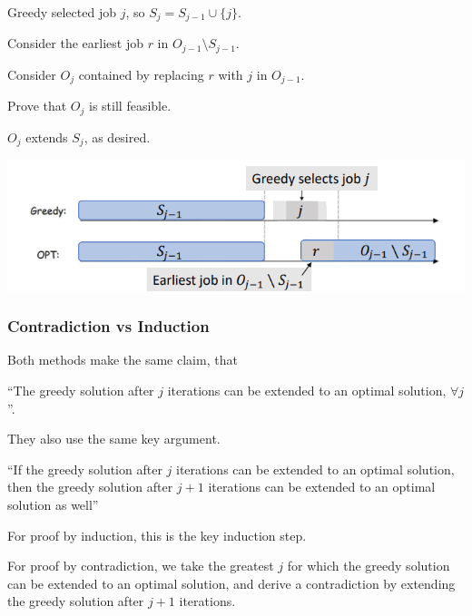 \begin{listu}
\begin{listo}
        \item Greedy selected job $j$, so $S_j = S_{j-1} \cup \{j\}$.

        \begin{listu}
            \item Consider the earliest job $r$ in $O_{j-1} \setminus S_{j-1}$.
            \item Consider $O_j$ contained by replacing $r$ with $j$ in $O_{j-1}$.
            \item Prove that $O_j$ is still feasible.
            \item $O_j$ extends $S_j$, as desired.
        \end{listu}

        \begin{center}
            \includegraphics[width=0.67\linewidth]{figures/interval-scheduling-induction.png}
        \end{center}
    \end{listo}
\end{listu}

\subsubsection{Contradiction vs Induction}

Both methods make the same claim, that \begin{center}
    ``The greedy solution after $j$ iterations can be extended to an optimal solution, $\forall j$''.
\end{center} They also use the same key argument. \begin{center} \begin{minipage}[t]{0.9\linewidth}
    ``If the greedy solution after $j$ iterations can be extended to an optimal solution, then the greedy solution after $j + 1$ iterations can be extended to an optimal solution as well''
\end{minipage}
\end{center}

\begin{listu}
    \item For proof by induction, this is the key induction step.
    \item For proof by contradiction, we take the greatest $j$ for which the greedy solution can be extended to an optimal solution, and derive a contradiction by extending the greedy solution after $j + 1$ iterations.
\end{listu}

